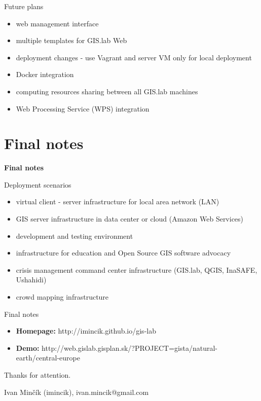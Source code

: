\documentclass[12pt]{beamer}
\begin{document}
\begin{frame}{Future plans}
	\begin{itemize}
		\item web management interface
		\item multiple templates for GIS.lab Web
		\item deployment changes - use Vagrant and server VM only for local deployment
		\item Docker integration
		\item computing resources sharing between all GIS.lab machines
		\item Web Processing Service (WPS) integration
	\end{itemize}
\end{frame}


\section{Final notes}
\begin{frame}
	\begin{center}
		\LARGE\textbf{Final notes}
	\end{center}
\end{frame}


\begin{frame}{Deployment scenarios}
	\begin{itemize}
		\item virtual client - server infrastructure for local area network (LAN)
		\item GIS server infrastructure in data center or cloud (Amazon Web Services)
		\item development and testing environment
		\item infrastructure for education and Open Source GIS software advocacy
		\item crisis management command center infrastructure (GIS.lab, QGIS, InaSAFE, Ushahidi)
		\item crowd mapping infrastructure
	\end{itemize}
\end{frame}


\begin{frame}{Final notes}
	\begin{itemize}
		\item \textbf{Homepage:} http://imincik.github.io/gis-lab
		\item \textbf{Demo:} http://web.gislab.gisplan.sk/?PROJECT=gista/natural-earth/central-europe
	\end{itemize}
	
	\bigskip
	Thanks for attention.
	
	Ivan Minčík (imincik), ivan.mincik@gmail.com
\end{frame}


\end{document}
